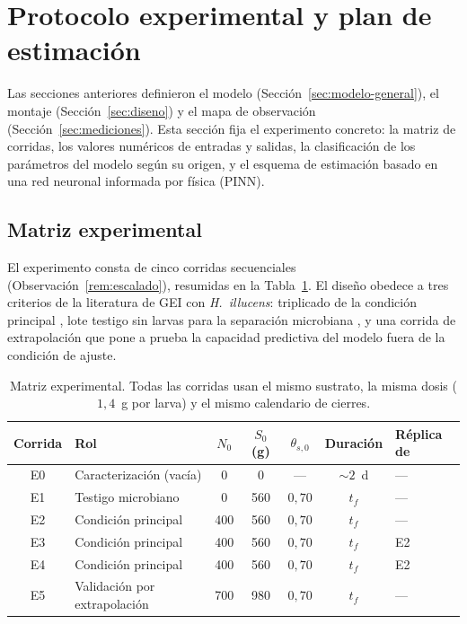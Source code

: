 \section{Protocolo experimental y plan de estimación}\label{sec:protocolo}

Las secciones anteriores definieron el modelo (Sección~\ref{sec:modelo-general}),
el montaje (Sección~\ref{sec:diseno}) y el mapa de observación
(Sección~\ref{sec:mediciones}). Esta sección fija el experimento concreto:
la matriz de corridas, los valores numéricos de entradas y salidas, la
clasificación de los parámetros del modelo según su origen, y el esquema de
estimación basado en una red neuronal informada por física (PINN).

\subsection{Matriz experimental}\label{sec:matriz}

El experimento consta de cinco corridas secuenciales
(Observación~\ref{rem:escalado}), resumidas en la
Tabla~\ref{tab:matriz-experimental}. El diseño obedece a tres criterios de la
literatura de GEI con \textit{H.~illucens}: triplicado de la condición
principal \citep{lindbergProcessEfficiencyGreenhouse2022,pangInfluenceCarbonNitrogen2020},
lote testigo sin larvas para la separación microbiana
\citep{parodiBioconversionEfficienciesGreenhouse2020a,rossiEstimatingDynamicsGreenhouse2024a},
y una corrida de extrapolación que pone a prueba la capacidad predictiva del
modelo fuera de la condición de ajuste.

\begin{table}[htbp]
  \centering
  \caption{Matriz experimental. Todas las corridas usan el mismo sustrato,
  la misma dosis ($1{,}4$~g por larva) y el mismo calendario de cierres.}
  \label{tab:matriz-experimental}
  \begin{tabular}{clccccl}
    \hline
    Corrida & Rol & $N_0$ & $S_0$ (g) & $\theta_{s,0}$ & Duración & Réplica de \\
    \hline
    E0 & Caracterización (vacía) & 0 & 0 & --- & $\sim 2$~d & --- \\
    E1 & Testigo microbiano & 0 & 560 & $0{,}70$ & $t_f$ & --- \\
    E2 & Condición principal & 400 & 560 & $0{,}70$ & $t_f$ & --- \\
    E3 & Condición principal & 400 & 560 & $0{,}70$ & $t_f$ & E2 \\
    E4 & Condición principal & 400 & 560 & $0{,}70$ & $t_f$ & E2 \\
    E5 & Validación por extrapolación & 700 & 980 & $0{,}70$ & $t_f$ & --- \\
    \hline
  \end{tabular}
\end{table}


